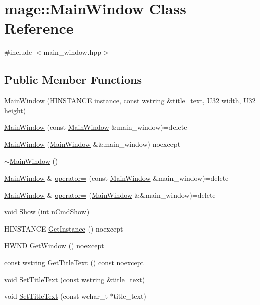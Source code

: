 \hypertarget{classmage_1_1_main_window}{}\section{mage\+:\+:Main\+Window Class Reference}
\label{classmage_1_1_main_window}


{\ttfamily \#include $<$main\+\_\+window.\+hpp$>$}

\subsection*{Public Member Functions}
\begin{DoxyCompactItemize}
\item 
\hyperlink{classmage_1_1_main_window_a25b4ed30aa624d87249dce5ef636e3e3}{Main\+Window} (H\+I\+N\+S\+T\+A\+N\+CE instance, const wstring \&title\+\_\+text, \hyperlink{namespacemage_a41c104c036fba3756a74e19f793eeaa1}{U32} width, \hyperlink{namespacemage_a41c104c036fba3756a74e19f793eeaa1}{U32} height)
\item 
\hyperlink{classmage_1_1_main_window_a8dc3c590bb168f8178a7db72ff60fd0c}{Main\+Window} (const \hyperlink{classmage_1_1_main_window}{Main\+Window} \&main\+\_\+window)=delete
\item 
\hyperlink{classmage_1_1_main_window_a6efac47e537a724653125d5114667749}{Main\+Window} (\hyperlink{classmage_1_1_main_window}{Main\+Window} \&\&main\+\_\+window) noexcept
\item 
\hyperlink{classmage_1_1_main_window_ada7ecf97d82ce08ba2f31f0afd891031}{$\sim$\+Main\+Window} ()
\item 
\hyperlink{classmage_1_1_main_window}{Main\+Window} \& \hyperlink{classmage_1_1_main_window_a0c2414ae4e627fb401c045371c286de0}{operator=} (const \hyperlink{classmage_1_1_main_window}{Main\+Window} \&main\+\_\+window)=delete
\item 
\hyperlink{classmage_1_1_main_window}{Main\+Window} \& \hyperlink{classmage_1_1_main_window_a684d547966f69ef5df793b5ce516f76a}{operator=} (\hyperlink{classmage_1_1_main_window}{Main\+Window} \&\&main\+\_\+window)=delete
\item 
void \hyperlink{classmage_1_1_main_window_a7e15913e45eeea42aace7f7ca96b25ec}{Show} (int n\+Cmd\+Show)
\item 
H\+I\+N\+S\+T\+A\+N\+CE \hyperlink{classmage_1_1_main_window_ac981116ddb31a0911ee849161eb1f27d}{Get\+Instance} () noexcept
\item 
H\+W\+ND \hyperlink{classmage_1_1_main_window_ab9409b69a6358e3faa3ee0cfd41f6a46}{Get\+Window} () noexcept
\item 
const wstring \hyperlink{classmage_1_1_main_window_a16ea3780659e00c8e4732b518c7c4a1e}{Get\+Title\+Text} () const noexcept
\item 
void \hyperlink{classmage_1_1_main_window_a58fe60e4f660c67b92c90d85e515645d}{Set\+Title\+Text} (const wstring \&title\+\_\+text)
\item 
void \hyperlink{classmage_1_1_main_window_aa86cdd0cd0f7345270ef88d72da446e2}{Set\+Title\+Text} (const wchar\+\_\+t $\ast$title\+\_\+text)
\end{DoxyCompactItemize}
